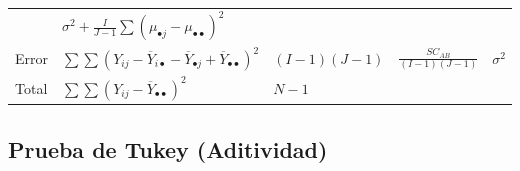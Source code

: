 \documentclass[]{book}
\theoremstyle{definition}
\theoremstyle{definition}
\theoremstyle{definition}
\theoremstyle{remark}
\begin{document}
\begin{longtable}[]{@{}lllll@{}}
\begin{minipage}[t]{0.15\columnwidth}
\end{minipage} & \begin{minipage}[t]{0.22\columnwidth}\raggedright
\(\sigma^{2} + \frac{I}{J - 1}\sum\left( \mu_{\bullet j} - \mu_{\bullet \bullet} \right)^{2}\)\strut
\end{minipage}\tabularnewline
\begin{minipage}[t]{0.04\columnwidth}\raggedright
Error\strut
\end{minipage} & \begin{minipage}[t]{0.40\columnwidth}\raggedright
\(\sum\sum{\left( Y_{ij} - \overline{Y}_{i\bullet} - \overline{Y}_{\bullet j} + \overline{Y}_{\bullet\bullet} \right)}^{2}\)\strut
\end{minipage} & \begin{minipage}[t]{0.03\columnwidth}\raggedright
\((I - 1)(J - 1)\)\strut
\end{minipage} & \begin{minipage}[t]{0.15\columnwidth}\raggedright
\(\frac{SC_{{AB}}}{\left( I - 1 \right)\left( J - 1 \right)}\)\strut
\end{minipage} & \begin{minipage}[t]{0.22\columnwidth}\raggedright
\(\sigma^{2}\)\strut
\end{minipage}\tabularnewline
\begin{minipage}[t]{0.04\columnwidth}\raggedright
Total\strut
\end{minipage} & \begin{minipage}[t]{0.40\columnwidth}\raggedright
\(\sum\sum\left( Y_{ij} - \overline{Y}_{\bullet \bullet} \right)^{2}\)\strut
\end{minipage} & \begin{minipage}[t]{0.03\columnwidth}\raggedright
\(N - 1\)\strut
\end{minipage} & \begin{minipage}[t]{0.15\columnwidth}\raggedright
\strut
\end{minipage} & \begin{minipage}[t]{0.22\columnwidth}\raggedright
\strut
\end{minipage}\tabularnewline
\bottomrule
\end{longtable}

\hypertarget{prueba-de-tukey-aditividad}{%
\subsection{Prueba de Tukey
(Aditividad)}\label{prueba-de-tukey-aditividad}}
\end{document}
